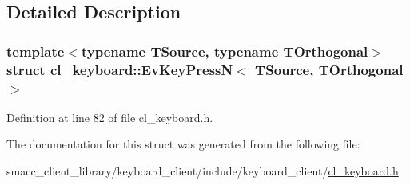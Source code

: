 \subsection{Detailed Description}
\subsubsection*{template$<$typename T\+Source, typename T\+Orthogonal$>$\newline
struct cl\+\_\+keyboard\+::\+Ev\+Key\+Press\+N$<$ T\+Source, T\+Orthogonal $>$}



Definition at line 82 of file cl\+\_\+keyboard.\+h.



The documentation for this struct was generated from the following file\+:\begin{DoxyCompactItemize}
\item 
smacc\+\_\+client\+\_\+library/keyboard\+\_\+client/include/keyboard\+\_\+client/\hyperlink{cl__keyboard_8h}{cl\+\_\+keyboard.\+h}\end{DoxyCompactItemize}
